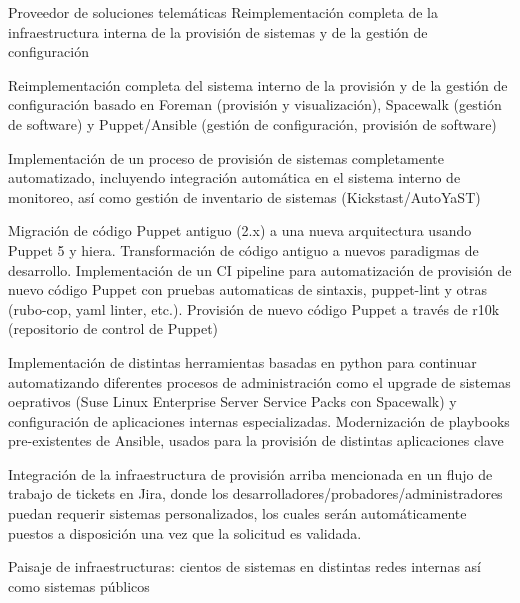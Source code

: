 

\begin{cventries}
  \cventry
    {Proveedor de soluciones telemáticas}
    {Reimplementación completa de la infraestructura interna de la provisión de sistemas y de la gestión de configuración}
    {}
    {}
    {
      \begin{cvitems}
      \item Reimplementación completa del sistema interno de la provisión y de la gestión de configuración
basado en Foreman (provisión y visualización), Spacewalk (gestión de software) y Puppet/Ansible (gestión de configuración, provisión de software)
 \item Implementación de un proceso de provisión de sistemas completamente automatizado, incluyendo integración automática en el sistema interno de monitoreo, así como gestión de inventario de sistemas (Kickstast/AutoYaST)
 \item Migración de código Puppet antiguo (2.x) a una nueva arquitectura usando Puppet 5 y hiera.
  Transformación de código antiguo a nuevos paradigmas de desarrollo. Implementación de un CI
  pipeline para automatización de provisión de nuevo código Puppet con pruebas automaticas de
  sintaxis, puppet-lint y otras (rubo-cop, yaml linter, etc.). Provisión de nuevo código Puppet a través de r10k (repositorio de control de Puppet)
\item Implementación de distintas herramientas basadas en python para continuar automatizando diferentes
  procesos de administración como el upgrade de sistemas oeprativos (Suse Linux Enterprise Server
  Service Packs con Spacewalk) y configuración de aplicaciones internas especializadas.
  Modernización de playbooks pre-existentes de Ansible, usados para la provisión de distintas aplicaciones clave
\item Integración de la infraestructura de provisión arriba mencionada en un flujo de trabajo de
   tickets en Jira, donde los desarrolladores/probadores/administradores puedan requerir sistemas
   personalizados, los cuales serán automáticamente puestos a disposición una vez que la solicitud es validada.
 \item Paisaje de infraestructuras: cientos de sistemas en distintas redes internas así como sistemas públicos

\end{cvitems}}
\end{cventries}
